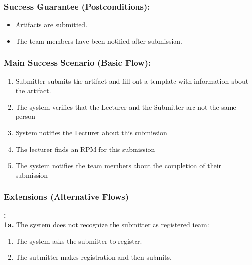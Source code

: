     


    
    
    
    \subsubsection*{Success Guarantee (Postconditions):}
    \begin{itemize}
    \itemsep-1em 
       \item Artifacts are submitted.
       \item The team members have been notified after submission.
       
    \end{itemize}
    
    
    
    \subsubsection*{Main Success Scenario (Basic Flow):}
    \begin{enumerate}
        \itemsep-1em 
        \item Submitter submits the artifact and fill out a template with information about the artifact.
        \item The system verifies that the Lecturer and the Submitter are not the same person
        \item System notifies the Lecturer about this submission
         \item The lecturer finds an RPM for this submission 
         \item The system notifies the team members about the completion of their submission  
    \end{enumerate}
    
    
    
    
     \subsubsection*{Extensions (Alternative Flows)}\textbf{:}
     \newline
     \\
     \textbf{1a. }The system does not recognize the submitter as registered team:
     \begin{enumerate}
         \itemsep-1em 
        \item The system asks the submitter to register.
        \item The submitter makes registration and then submits.
    \end{enumerate}
    
